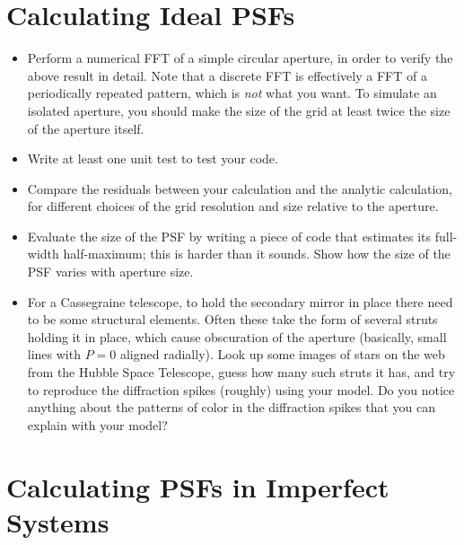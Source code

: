 \documentclass[11pt, preprint]{aastex}
\begin{document}
\section{Calculating Ideal PSFs}

\begin{itemize}
\item Perform a numerical FFT of a simple circular aperture, in order
  to verify the above result in detail. Note that a discrete FFT is
  effectively a FFT of a periodically repeated pattern, which is {\it
    not} what you want. To simulate an isolated aperture, you should
  make the size of the grid at least twice the size of the aperture
  itself.
\item Write at least one unit test to test your code.
\item Compare the residuals between your calculation and the analytic
  calculation, for different choices of the grid resolution and size
  relative to the aperture.
\item Evaluate the size of the PSF by writing a piece of code that
  estimates its full-width half-maximum; this is harder than it
  sounds.  Show how the size of the PSF varies with aperture size.
\item For a Cassegraine telescope, to hold the secondary mirror in
  place there need to be some structural elements.  Often these take
  the form of several struts holding it in place, which cause
  obscuration of the aperture (basically, small lines with $P=0$
  aligned radially). Look up some images of stars on the web from the
  Hubble Space Telescope, guess how many such struts it has, and try
  to reproduce the diffraction spikes (roughly) using your model. Do
  you notice anything about the patterns of color in the diffraction
  spikes that you can explain with your model?
\end{itemize}

\section{Calculating PSFs in Imperfect Systems}
\end{document}
